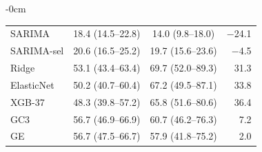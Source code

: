 \begin{table}[htbp]
\begin{adjustwidth}{-\extralength}{0cm}
\begin{tabular}{lccr}
SARIMA & 18.4 (14.5--22.8) & 14.0 (9.8--18.0) & $-$24.1 \\
SARIMA-sel & 20.6 (16.5--25.2) & 19.7 (15.6--23.6) & $-$4.5 \\
Ridge & 53.1 (43.4--63.4) & 69.7 (52.0--89.3) & 31.3 \\
ElasticNet & 50.2 (40.7--60.4) & 67.2 (49.5--87.1) & 33.8 \\
XGB-37 & 48.3 (39.8--57.2) & 65.8 (51.6--80.6) & 36.4 \\
GC3 & 56.7 (46.9--66.9) & 60.7 (46.2--76.3) & 7.2 \\
GE & 56.7 (47.5--66.7) & 57.9 (41.8--75.2) & 2.0 \\
\bottomrule
\end{tabular}
\end{adjustwidth}
\end{table}

